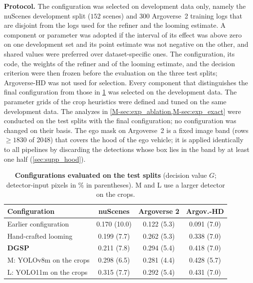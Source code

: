 \documentclass[10pt,letterpaper]{article}
\newcommand{\method}{DGSP\xspace}
\newcommand{\G}{G}
\newcommand{\oursrow}{\rowcolor{oursbg}}
\theoremstyle{remark}
\theoremstyle{plain}
\theoremstyle{definition}
\begin{document}
\noindent\textbf{Protocol.}
The configuration was selected on development data only, namely the nuScenes development split ($152$ scenes) and $300$ Argoverse~2 training logs that are disjoint from the logs used for the refiner and the looming estimate.
A component or parameter was adopted if the interval of its effect was above zero on one development set and its point estimate was not negative on the other, and shared values were preferred over dataset-specific ones.
The configuration, its code, the weights of the refiner and of the looming estimate, and the decision criterion were then frozen before the evaluation on the three test splits; Argoverse-HD was not used for selection.
Every component that distinguishes the final configuration from those in \cref{tab:versions} was selected on the development data.
The parameter grids of the crop heuristics were defined and tuned on the same development data.
The analyzes in \cref*{M-sec:exp_ablation,M-sec:exp_exact} were conducted on the test splits with the final configuration; no configuration was changed on their basis.
The ego mask on Argoverse~2 is a fixed image band (rows $\ge1830$ of 2048) that covers the hood of the ego vehicle; it is applied identically to all pipelines by discarding the detections whose box lies in the band by at least one half (\cref{sec:supp_hood}).

\begin{table}[!tbp]
\centering
\caption{\textbf{Configurations evaluated on the test splits} (decision value $\G$; detector-input pixels in \% in parentheses). M and L use a larger detector on the crops.}
\label{tab:versions}
\small
\setlength{\tabcolsep}{2.5pt}
\begin{tabular}{@{}lccc@{}}
\toprule
Configuration & nuScenes & Argoverse 2 & Argov.-HD \\
\midrule
Earlier configuration & 0.170 (10.0) & 0.122 (5.3) & 0.091 (7.0) \\
Hand-crafted looming & 0.199 (7.7) & 0.262 (5.3) & 0.338 (7.0) \\
\oursrow \textbf{\method} & 0.211 (7.8) & 0.294 (5.4) & 0.418 (7.0) \\
\midrule
M: YOLOv8m on the crops & 0.298 (6.5) & 0.281 (4.4) & 0.428 (5.7) \\
L: YOLO11m on the crops & 0.315 (7.7) & 0.292 (5.4) & 0.431 (7.0) \\
\bottomrule
\end{tabular}
\end{table}
\end{document}
